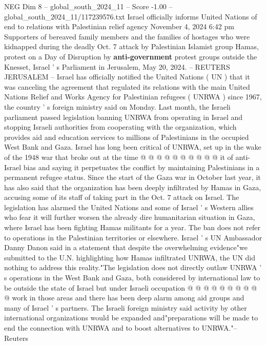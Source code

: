 \begin{textsample}{NEG Dim 8 – global\_south\_2024\_11 – Score -1.00 – global\_south\_2024\_11/117239576.txt}  \label{ex:f8_neg_290}
Israel officially informs United Nations of end to relations with Palestinian relief agency November 4, 2024 6:42 pm Supporters of bereaved family members and the families of hostages who were kidnapped during the deadly Oct. 7 attack by Palestinian Islamist group Hamas, protest on a Day of Disruption by \textbf{anti-government} protest groups outside the Knesset, Israel ' s Parliament in Jerusalem, May 20, 2024. -- REUTERS JERUSALEM -- Israel has officially notified the United Nations ( UN ) that it was canceling the agreement that regulated its relations with the main United Nations Relief and Works Agency for Palestinian refugees ( UNRWA ) since 1967, the country ' s foreign ministry said on Monday.
Last month, the Israeli parliament passed legislation banning UNRWA from operating in Israel and stopping Israeli authorities from cooperating with the organization, which provides aid and education services to millions of Palestinians in the occupied West Bank and Gaza.
Israel has long been critical of UNRWA, set up in the wake of the 1948 war that broke out at the time @ @ @ @ @ @ @ @ @ @ it of anti-Israel bias and saying it perpetuates the conflict by maintaining Palestinians in a permanent refugee status.
Since the start of the Gaza war in October last year, it has also said that the organization has been deeply infiltrated by Hamas in Gaza, accusing some of its staff of taking part in the Oct. 7 attack on Israel.
The legislation has alarmed the United Nations and some of Israel ' s Western allies who fear it will further worsen the already dire humanitarian situation in Gaza, where Israel has been fighting Hamas militants for a year.
The ban does not refer to operations in the Palestinian territories or elsewhere.
Israel ' s UN Ambassador Danny Danon said in a statement that despite the overwhelming evidence"we submitted to the U.N. highlighting how Hamas infiltrated UNRWA, the UN did nothing to address this reality."The legislation does not directly outlaw UNRWA ' s operations in the West Bank and Gaza, both considered by international law to be outside the state of Israel but under Israeli occupation @ @ @ @ @ @ @ @ @ @ work in those areas and there has been deep alarm among aid groups and many of Israel ' s partners.
The Israeli foreign ministry said activity by other international organizations would be expanded and"preparations will be made to end the connection with UNRWA and to boost alternatives to UNRWA."-- Reuters

\end{textsample}
